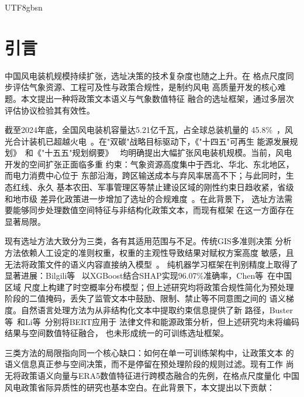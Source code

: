 \documentclass[12pt, a4paper]{article}
\begin{document}
\begin{CJK}{UTF8}{gbsn}
\section{引言}

中国风电装机规模持续扩张，选址决策的技术复杂度也随之上升。在
格点尺度同步评估气象资源、工程可及性与政策合规性，是制约风电
高质量开发的核心难题。本文提出一种将政策文本语义与气象数值特征
融合的选址框架，通过多层次评估协议检验其有效性。

截至2024年底，全国风电装机容量达5.21亿千瓦，占全球总装机量的
45.8\%~\cite{ruan2025,he2023}，风光合计装机已超越火电~\cite{ruan2025}。在"双碳"战略目标驱动下，《"十四五"可再生
能源发展规划》~\cite{ndrc2022}和《"十五五"规划纲要》~\cite{ndrc2026}
均明确提出大幅扩张风电装机规模。当前，风电开发的空间扩张正面临多重
约束：气象资源高度集中于西北、华北、东北地区，而电力消费中心位于
东部沿海，跨区输送成本与弃风率居高不下；与此同时，生态红线、永久
基本农田、军事管理区等禁止建设区域的刚性约束日趋收紧，省级和地市级
差异化政策进一步增加了选址的合规难度~\cite{zhong2022}。在此背景下，
选址方法需要能够同步处理数值空间特征与非结构化政策文本，而现有框架
在这一方面存在显著局限。

现有选址方法大致分为三类，各有其适用范围与不足。传统GIS多准则决策
分析方法依赖人工设定的准则权重，权重的主观性导致结果对赋权方案高度
敏感，且无法将政策文件的语义内容直接纳入模型~\cite{xu2020,wu2022}。
纯机器学习框架在判别精度上取得了显著进展：Bilgili等~\cite{bilgili2024}
以XGBoost结合SHAP实现96.07\%准确率，Chen等~\cite{chen2026}在中国区域
尺度上构建了时空概率分布模型；但上述研究均将政策合规性简化为预处理
阶段的二值掩码，丢失了监管文本中鼓励、限制、禁止等不同意图之间的
语义梯度。自然语言处理方法为从非结构化文本中提取约束信息提供了新
路径，Buster等~\cite{buster2024}和Li等~\cite{li2023}分别将BERT应用于
法律文件和能源政策分析，但上述研究均未将编码结果与空间数值特征融合，
也未形成统一的可训练选址框架。

三类方法的局限指向同一个核心缺口：如何在单一可训练架构中，让政策文本
的语义信息真正参与空间决策，而不是停留在预处理阶段的规则过滤。现有工作
尚无将政策语义向量与ERA5数值特征进行跨模态融合的先例，在格点尺度量化
中国风电政策省际异质性的研究也基本空白。在此背景下，本文提出以下贡献：


\end{CJK}
\end{document}
